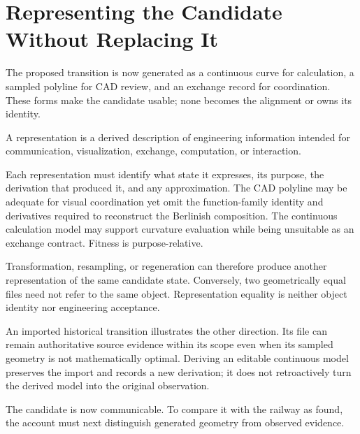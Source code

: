 
\chapter{Representing the Candidate Without Replacing It}
\label{chap:representations}

The proposed transition is now generated as a continuous curve for
calculation, a sampled polyline for CAD review, and an exchange record for
coordination. These forms make the candidate usable; none becomes the
alignment or owns its identity.

\begin{definition}[Representation]
\label{def:representation}
A representation is a derived description of engineering information
intended for communication, visualization, exchange, computation, or
interaction.
\end{definition}

Each representation must identify what state it expresses, its purpose, the
derivation that produced it, and any approximation. The CAD polyline may be
adequate for visual coordination yet omit the function-family identity and
derivatives required to reconstruct the Berlinish composition. The continuous
calculation model may support curvature evaluation while being unsuitable as
an exchange contract. Fitness is purpose-relative.

Transformation, resampling, or regeneration can therefore produce another
representation of the same candidate state. Conversely, two geometrically
equal files need not refer to the same object. Representation equality is
neither object identity nor engineering acceptance.

An imported historical transition illustrates the other direction. Its file
can remain authoritative source evidence within its scope even when its
sampled geometry is not mathematically optimal. Deriving an editable
continuous model preserves the import and records a new derivation; it does
not retroactively turn the derived model into the original observation.

The candidate is now communicable. To compare it with the railway as found,
the account must next distinguish generated geometry from observed evidence.
